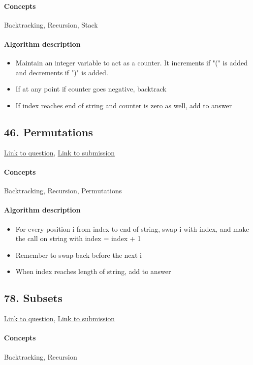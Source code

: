 \documentclass[11pt]{book}
\begin{document}
\paragraph{Concepts}
Backtracking, Recursion, Stack
\paragraph{Algorithm description}
\begin{itemize}
    \item Maintain an integer variable to act as a counter. It increments if "(" is added and decrements if ")" is added.
    \item If at any point if counter goes negative, backtrack
    \item If index reaches end of string and counter is zero as well, add to answer
\end{itemize}

\subsection{46. Permutations}
\href{https://leetcode.com/problems/permutations/}{Link to question},
\href{https://leetcode.com/submissions/detail/338753817/}{Link to submission}
\paragraph{Concepts}
Backtracking, Recursion, Permutations
\paragraph{Algorithm description}
\begin{itemize}
    \item For every position i from index to end of string, swap i with index, and make the call on string with index = index + 1
    \item Remember to swap back before the next i
    \item When index reaches length of string, add to answer
\end{itemize}

\subsection{78. Subsets}
\href{https://leetcode.com/problems/subsets/}{Link to question},
\href{https://leetcode.com/submissions/detail/338759211/}{Link to submission}
\paragraph{Concepts}
Backtracking, Recursion
\end{document}
